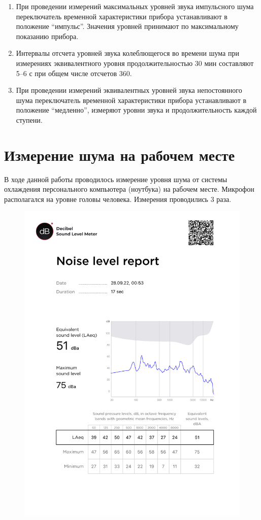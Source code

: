 \documentclass[a5paper, 12dd, twoside]{article}
\begin{document}
\begin{enumerate}
    \item При проведении измерений максимальных уровней звука импульсного шума переключатель временной характеристики прибора устанавливают в положение ``импульс''. Значения уровней принимают по максимальному показанию прибора.
    \item Интервалы отсчета уровней звука колеблющегося во времени шума при измерениях эквивалентного уровня продолжительностью 30 мин составляют 5–6 с при общем числе отсчетов 360.
    \item При проведении измерений эквивалентных уровней звука непостоянного шума переключатель временной характеристики прибора устанавливают в положение ``медленно'', измеряют уровни звука и продолжительность каждой ступени.
\end{enumerate}

\section{Измерение шума на рабочем месте}
В ходе данной работы проводилось измерение уровня шума от системы охлаждения персонального компьютера (ноутбука) на рабочем месте. Микрофон располагался на уровне головы человека. Измерения проводились 3 раза.

\begin{figure}[p]
    \centering
    \includegraphics[keepaspectratio, scale=0.6]{data/1.png}
\end{figure}
\end{document}
